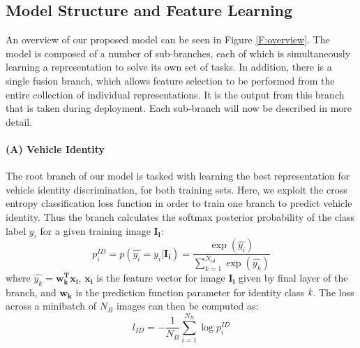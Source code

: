 \documentclass[10pt,twocolumn,letterpaper]{article}
\begin{document}
\subsection{Model Structure and Feature Learning}

An overview of our proposed model can be seen in Figure \ref{F:overview}. The model is composed of a number of sub-branches, each of which is simultaneously learning a representation to solve its own set of tasks. In addition, there is a single fusion branch, which allows feature selection to be performed from the entire collection of individual representations. It is the output from this branch that is taken during deployment. Each sub-branch will now be described in more detail.

\paragraph{(A) Vehicle Identity}

The root branch of our model is tasked with learning the best representation for vehicle identity discrimination, for both training sets. Here, we exploit the cross entropy classification loss function in order to train one branch to predict vehicle identity. Thus the branch calculates the softmax posterior probability of the class label $y_i$ for a given training image $\mathbf{I_i}$:
\begin{equation}
  p_i^{ID} = p(\hat{y_i} = y_i|\mathbf{I_i}) = \frac{\exp(\hat{y_i})}{\sum_{k=1}^{N_{id}}\exp(\hat{y_k})}
  \label{E:softmax_id}
\end{equation}
where $\hat{y_k} = \mathbf{w_k^Tx_i}$, $\mathbf{x_i}$ is the feature vector for image $\mathbf{I_i}$ given by final layer of the branch, and $\mathbf{w_k}$ is the prediction function parameter for identity class $\emph{k}$. The loss across a minibatch of $N_B$ images can then be computed as:
\begin{equation}
  l_{ID} = -\frac{1}{N_B} \sum_{i=1}^{N_B} \log{p_i^{ID}}
  \label{E:cross_entropy_loss}
\end{equation}
\end{document}
